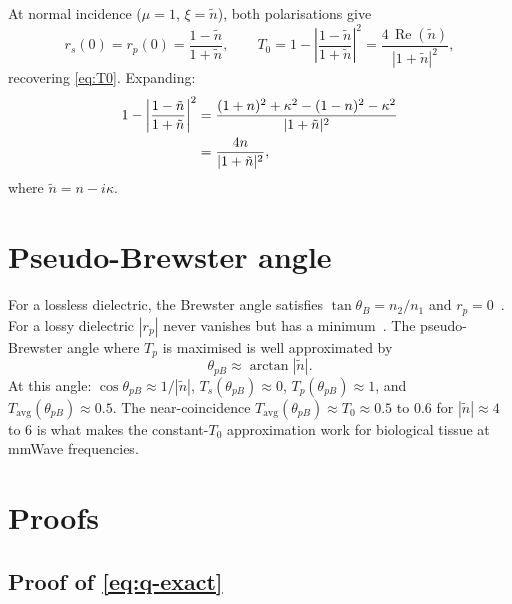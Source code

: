 \documentclass[11pt,a4paper]{article}
\theoremstyle{definition}      %
\newcommand{\Tavg}{T_{\mathrm{avg}}}
\newcommand{\ntilde}{\tilde{n}}
\DeclareMathOperator{\RE}{Re}
\begin{document}
At normal incidence ($\mu=1$, $\xi=\ntilde$), both polarisations
give
\begin{equation}
  r_s(0)=r_p(0) = \frac{1-\ntilde}{1+\ntilde},
  \qquad
  T_0 = 1 - \left|\frac{1-\ntilde}{1+\ntilde}\right|^2
  = \frac{4\,\RE(\ntilde)}{|1+\ntilde|^2},
\end{equation}
recovering \cref{eq:T0}.  Expanding:
\begin{align}
  1-\left|\frac{1-\ntilde}{1+\ntilde}\right|^2
  &= \frac{(1+n)^2+\kappa^2 - (1-n)^2 - \kappa^2}{|1+\ntilde|^2} \notag\\
  &= \frac{4n}{|1+\ntilde|^2},
\end{align}
where $\ntilde=n-i\kappa$.

\section{Pseudo-Brewster angle}\label{app:pseudo-brewster}

For a lossless dielectric, the Brewster angle satisfies
$\tan\theta_B=n_2/n_1$ and $r_p=0$~\cite{BornWolf1999}.  For a lossy
dielectric $|r_p|$ never vanishes but has a
minimum~\cite{Potter1970,Ohman1977}.  The pseudo-Brewster angle where
$T_p$ is maximised is well approximated by
\begin{equation}
  \theta_{pB} \approx \arctan|\ntilde|.
\end{equation}
At this angle: $\cos\theta_{pB}\approx 1/|\ntilde|$,
$T_s(\theta_{pB})\approx 0$, $T_p(\theta_{pB})\approx 1$, and
$\Tavg(\theta_{pB})\approx 0.5$.  The near-coincidence
$\Tavg(\theta_{pB})\approx T_0\approx 0.5$ to $0.6$ for
$|\ntilde|\approx 4$ to $6$ is what makes the constant-$T_0$
approximation work for biological tissue at mmWave frequencies.

\section{Proofs}\label{app:proofs}

\subsection{Proof of \texorpdfstring{\cref{eq:q-exact}}{Equation \ref*{eq:q-exact}}}\label{app:q-proof}
\end{document}
